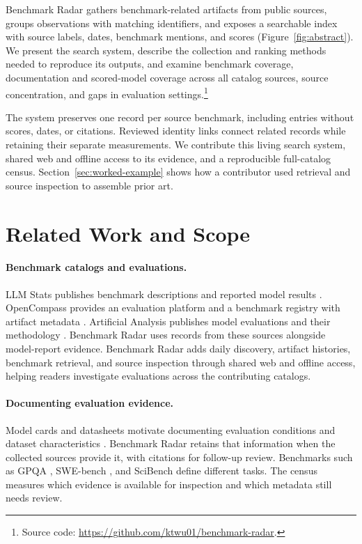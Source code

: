 \documentclass[11pt]{article}
\begin{document}
Benchmark Radar gathers benchmark-related artifacts from public sources, groups observations with matching identifiers, and exposes a searchable index with source labels, dates, benchmark mentions, and scores (Figure~\ref{fig:abstract}). We present the search system, describe the collection and ranking methods needed to reproduce its outputs, and examine benchmark coverage, documentation and scored-model coverage across all catalog sources, source concentration, and gaps in evaluation settings.\footnote{Source code: \url{https://github.com/ktwu01/benchmark-radar}.}

The system preserves one record per source benchmark, including entries without scores, dates, or citations. Reviewed identity links connect related records while retaining their separate measurements. We contribute this living search system, shared web and offline access to its evidence, and a reproducible full-catalog census. Section~\ref{sec:worked-example} shows how a contributor used retrieval and source inspection to assemble prior art.

\section{Related Work and Scope}
\label{sec:related-work}

\paragraph{Benchmark catalogs and evaluations.}
LLM Stats publishes benchmark descriptions and reported model results \citep{llmstats2026benchmarks}. OpenCompass provides an evaluation platform and a benchmark registry with artifact metadata \citep{opencompass2026datasetstatistics}. Artificial Analysis publishes model evaluations and their methodology \citep{artificialanalysis2026methodology}. Benchmark Radar uses records from these sources alongside model-report evidence. Benchmark Radar adds daily discovery, artifact histories, benchmark retrieval, and source inspection through shared web and offline access, helping readers investigate evaluations across the contributing catalogs.

\paragraph{Documenting evaluation evidence.}
Model cards and datasheets motivate documenting evaluation conditions and dataset characteristics \citep{mitchell2019modelcards,gebru2021datasheets}. Benchmark Radar retains that information when the collected sources provide it, with citations for follow-up review. Benchmarks such as GPQA \citep{rein2023gpqa}, SWE-bench \citep{jimenez2023swebench}, and SciBench \citep{wang2023scibench} define different tasks. The census measures which evidence is available for inspection and which metadata still needs review.
\end{document}
